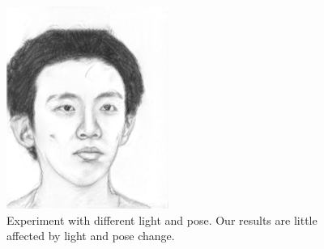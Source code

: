 \documentclass[10pt,twocolumn,letterpaper]{article}
\begin{document}
\begin{figure}[htbp]
{\begin{minipage}[b]{0.22\linewidth}
\includegraphics[width=0.99\linewidth]{img/light&pose_invariance/ours_p2.png}
\end{minipage}
}
\caption{Experiment with different light and pose. Our results are little affected by light and pose change.}
\label{fig:light_pose}
\end{figure}
\end{document}
